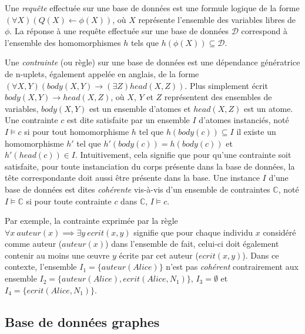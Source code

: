 \begin{definition}[Requête]
Une \emph{requête} effectuée sur une base de données est une formule logique de la forme $(\forall X)(Q(X) \gets \phi(X))$, où $X$ représente l'ensemble des variables libres de $\phi$.
La réponse à une requête effectuée sur une base de données $\mathcal{D}$ correspond à l'ensemble des homomorphismes $h$ tels que $h(\phi(X)) \subseteq \mathcal{D}$.
\end{definition}

\begin{definition}[Contrainte]
Une \emph{contrainte} (ou règle) sur une base de données est une dépendance génératrice de n-uplets, également appelée  en anglais, de la forme $(\forall X, Y)(body(X, Y) \to (\exists Z)head(X, Z))$.
Plus simplement écrit $body(X, Y) \to head(X, Z)$, où $X$, $Y$ et $Z$ représentent des ensembles de variables, $body(X, Y)$ est un ensemble d'atomes et $head(X, Z)$ est un atome.
Une contrainte $c$ est dite satisfaite par un ensemble $I$ d'atomes instanciés, noté $I \vDash c$ si pour tout homomorphisme $h$ tel que $h(body(c)) \subseteq I$ il existe un homomorphisme $h'$ tel que $h'(body(c)) = h(body(c))$ et $h'(head(c)) \in I$.
Intuitivement, cela signifie que pour qu'une contrainte soit satisfaite, pour toute instanciation du corps présente dans la base de données, la tête correspondante doit aussi être présente dans la base.
Une instance $I$ d'une base de données est dites \emph{cohérente} vis-à-vis d'un ensemble de contraintes $\mathbb{C}$, noté $I \vDash \mathbb{C}$ si pour toute contrainte $c$ dans $\mathbb{C}$, $I \vDash c$.

Par exemple, la contrainte exprimée par la règle $\forall x~auteur(x) \implies \exists y~ecrit(x,y)$ signifie que pour chaque individu $x$ considéré comme auteur ($auteur(x)$) dans l'ensemble de fait, celui-ci doit également contenir au moins une œuvre $y$ écrite par cet auteur ($ecrit(x,y)$).
Dans ce contexte, l'ensemble $I_1 = \{auteur(Alice)\}$ n'est pas \emph{cohérent} contrairement aux ensemble $I_2 = \{auteur(Alice), ecrit(Alice, N_1)\}$, $I_3 = \emptyset$ et $I_4 = \{ecrit(Alice, N_1)\}$.
\end{definition}

\subsection{Base de données graphes}
\label{sec:update:pre:graph}

